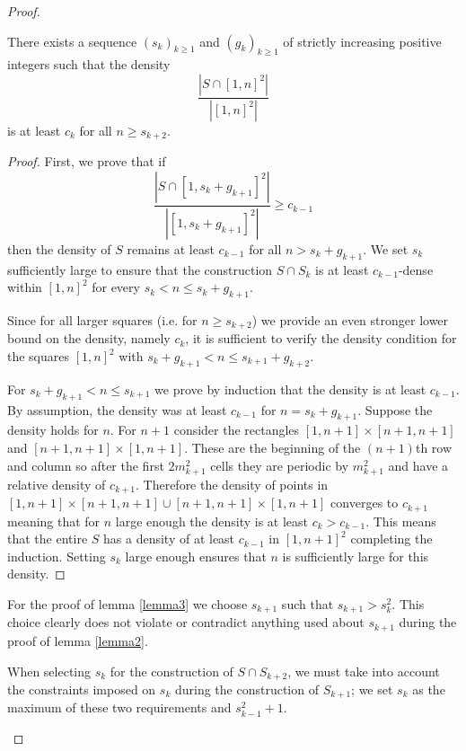 \documentclass[11pt,a4paper]{article}
\numberwithin{equation}{section}
\begin{document}
\begin{proof}
\begin{lemma} \label{lemma2}
There exists a sequence $(s_k)_{k\ge 1}$ and $(g_k)_{k\ge 1}$ of strictly increasing positive integers such that the density $$\frac{|S\cap [1,n]^2|}{|[1,n]^2|}$$ is at least $c_k$ for all $n\ge s_{k+2}$.
\end{lemma}
\begin{proof}
First, we prove that if
$$\frac{|S\cap [1,s_{k}+g_{k+1}]^2|}{|[1, s_{k}+g_{k+1}]^2|}\ge c_{k-1}$$
then the density of $S$ remains at least $c_{k-1}$ for all $n>s_{k}+g_{k+1}$. We set $s_k$ sufficiently large to ensure that the construction $S\cap S_{k}$ is at least $c_{k-1}$-dense within $[1,n]^2$ for every $s_{k}<n\le s_{k}+g_{k+1}$.

Since for all larger squares (i.e. for $n\ge s_{k+2}$) we provide an even stronger lower bound on the density, namely $c_{k}$, it is sufficient to verify the density condition for the squares $[1,n]^2$ with $s_{k}+ g_{k+1}< n\le  s_{k+1}+g_{k+2}$.

For $s_{k}+ g_{k+1}< n\le  s_{k+1}$ we prove by induction that the density is at least $c_{k-1}$.
By assumption, the density was at least $c_{k-1}$ for $n=s_k+g_{k+1}$. Suppose the density holds for $n$. For $n+1$ consider the rectangles $[1, n+1]\times[n+1,n+1]$ and $[n+1,n+1] \times [1, n+1]$. These are the beginning of the $(n+1)$th row and column so after the first $2m_{k+1}^2$ cells they are periodic by $m_{k+1}^2$ and have a relative density of $c_{k+1}$. Therefore the density of points in $[1, n+1]\times[n+1,n+1]\cup [n+1,n+1] \times [1, n+1]$ converges to $c_{k+1}$ meaning that for $n$ large enough the density is at least  $c_k>c_{k-1}$. This means that the entire $S$ has a density of at least $c_{k-1}$ in $[1,n+1]^2$ completing the induction. Setting $s_k$ large enough ensures that $n$ is sufficiently large for this density.
\end{proof}
\noindent
For the proof of lemma \ref{lemma3} we choose $s_{k+1}$ such that $s_{k+1}>s_k^2$. This choice clearly does not violate or contradict anything used about $s_{k+1}$ during the proof of lemma \ref{lemma2}.
\begin{note}
When selecting $s_k$ for the construction of $S\cap S_{k+2}$, we must take into account the constraints imposed on $s_k$ during the construction of $S_{k+1}$; we set $s_k$ as the maximum of these two requirements and $s_{k-1}^2+1$.
\end{note}

\begin{figure}[ht]
    \centering
    \begin{subfigure}[b]{0.48\textwidth}
        \centering
\end{subfigure}
\end{figure}
\end{proof}
\end{document}
